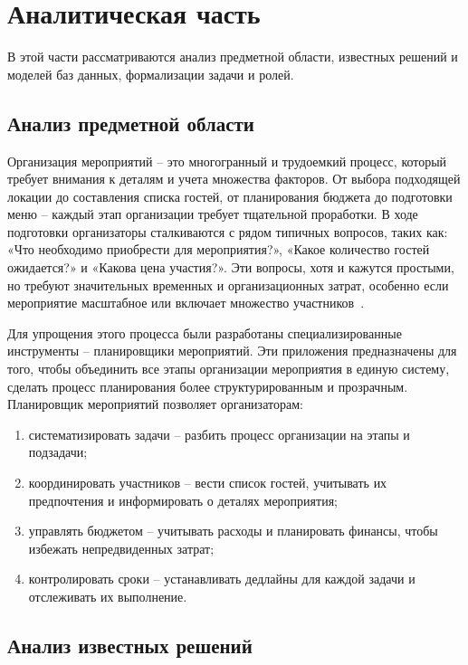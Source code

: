 \chapter{Аналитическая часть}

В этой части рассматриваются анализ предметной области, известных решений и моделей баз данных, формализации задачи и ролей.

\section{Анализ предметной области}

Организация мероприятий -- это многогранный и трудоемкий процесс, который требует внимания к деталям и учета множества факторов. От выбора подходящей локации до составления списка гостей, от планирования бюджета до подготовки меню -- каждый этап организации требует тщательной проработки. В ходе подготовки организаторы сталкиваются с рядом типичных вопросов, таких как: «Что необходимо приобрести для мероприятия?», «Какое количество гостей ожидается?» и «Какова цена участия?». Эти вопросы, хотя и кажутся простыми, но требуют значительных временных и организационных затрат, особенно если мероприятие масштабное или включает множество участников~\cite{lit1}.

Для упрощения этого процесса были разработаны специализированные инструменты -- планировщики мероприятий. Эти приложения предназначены для того, чтобы объединить все этапы организации мероприятия в единую систему, сделать процесс планирования более структурированным и прозрачным. Планировщик мероприятий позволяет организаторам:
\begin{enumerate}
	\item систематизировать задачи -- разбить процесс организации на этапы и подзадачи;
	\item координировать участников -- вести список гостей, учитывать их предпочтения и информировать о деталях мероприятия;
	\item управлять бюджетом -- учитывать расходы и планировать финансы, чтобы избежать непредвиденных затрат;
	\item контролировать сроки -- устанавливать дедлайны для каждой задачи и отслеживать их выполнение.
\end{enumerate}


\section{Анализ известных решений}

